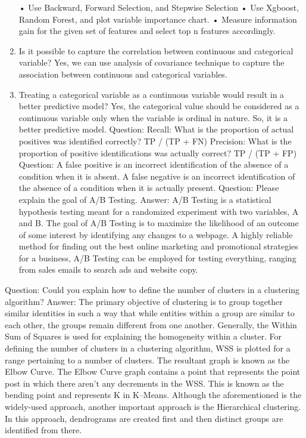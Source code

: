 \documentclass[
]{book}
\begin{document}
\begin{enumerate}
  • Use Backward, Forward Selection, and Stepwise Selection
  • Use Xgboost, Random Forest, and plot variable importance chart.
  • Measure information gain for the given set of features and select top n features accordingly.
\item
  Is it possible to capture the correlation between continuous and categorical variable?
  Yes, we can use analysis of covariance technique to capture the association between continuous and categorical variables.
\item
  Treating a categorical variable as a continuous variable would result in a better predictive model?
  Yes, the categorical value should be considered as a continuous variable only when the variable is ordinal in nature. So, it is a better predictive model.
  Question:
  Recall: What is the proportion of actual positives was identified correctly?
  TP / (TP + FN)
  Precision: What is the proportion of positive identifications was actually correct?
  TP / (TP + FP)
  Question:
  A false positive is an incorrect identification of the absence of a condition when it is absent.
  A false negative is an incorrect identification of the absence of a condition when it is actually present.
  Question: Please explain the goal of A/B Testing.
  Answer: A/B Testing is a statistical hypothesis testing meant for a randomized experiment with two variables, A and B. The goal of A/B Testing is to maximize the likelihood of an outcome of some interest by identifying any changes to a webpage.
  A highly reliable method for finding out the best online marketing and promotional strategies for a business, A/B Testing can be employed for testing everything, ranging from sales emails to search ads and website copy.
\end{enumerate}

Question: Could you explain how to define the number of clusters in a clustering algorithm?
Answer: The primary objective of clustering is to group together similar identities in such a way that while entities within a group are similar to each other, the groups remain different from one another.
Generally, the Within Sum of Squares is used for explaining the homogeneity within a cluster. For defining the number of clusters in a clustering algorithm, WSS is plotted for a range pertaining to a number of clusters. The resultant graph is known as the Elbow Curve.
The Elbow Curve graph contains a point that represents the point post in which there aren't any decrements in the WSS. This is known as the bending point and represents K in K--Means.
Although the aforementioned is the widely-used approach, another important approach is the Hierarchical clustering. In this approach, dendrograms are created first and then distinct groups are identified from there.
\end{document}

